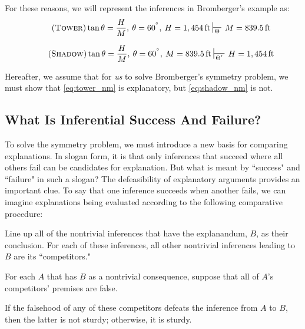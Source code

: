 \documentclass[natbib]{svjour3}                     %
\newcounter{fncntr}
\newcommand{\fnmark}[1]{\refstepcounter{fncntr}\label{#1}\footnotemark[\getrefnumber{#1}]}
\begin{document}
For these reasons, we will represent the inferences in Bromberger's example as:\\ 

\begin{equation}
\label{eq:tower_nm} \tag{\textsc{Tower}}
\tan \theta  = \frac{H}{M},\hspace{.5ex} \theta = 60^{^\circ},\hspace{.5ex} H = 1,454\,\text{ft} \sststile{\Theta}{}\, M =  839.5\,\text{ft}
\end{equation} 

\begin{equation}
\label{eq:shadow_nm}\tag{\textsc{Shadow}}
\tan \theta  = \frac{H}{M},\hspace{.5ex} \theta =  60^{^\circ},\hspace{.5ex}  M =  839.5\,\text{ft} \sststile{\Theta'}{}\, H = 1,454\,\text{ft}
\end{equation}


\noindent    Hereafter, we assume that for \textit{us} to solve Bromberger's symmetry problem, we must show that \ref{eq:tower_nm} is explanatory, but \ref{eq:shadow_nm} is not. 

\subsection{What Is Inferential Success And Failure?}
\label{subsec:success}
To solve the symmetry problem, we must introduce a new basis for comparing explanations. In slogan form, it is that only inferences that succeed where all others fail can be candidates for explanation. But what is meant by ``success" and ``failure" in such a slogan? The defeasibility of explanatory arguments provides an important clue. To say that one inference succeeds when another fails, we can imagine explanations being evaluated according to the following comparative procedure:\fnmark{procedure} 

\begin{description}
	\setlength\itemsep{.2cm}
	\item[Step 1:]   Line up all of the nontrivial inferences that have the explanandum, $B$, as their conclusion. For each of these inferences, all other nontrivial inferences leading to $B$ are its ``competitors."
	
	\item[Step 2:] For each $A$ that has $B$ as a nontrivial consequence, suppose that all of $A$'s competitors' premises are false.
	
	\item[Step 3:] If the falsehood of any of these competitors defeats the inference from $A$ to $B$, then the latter is not sturdy; otherwise, it is sturdy.
\end{description}
\end{document}
